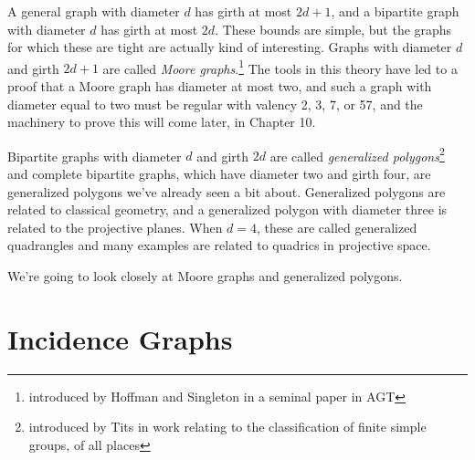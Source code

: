 \renewcommand{\exc}[1]{\subsubsection*{Exercise 5.#1}}


A general graph with diameter $d$ has girth at most $2d+1$, and a bipartite graph with diameter $d$ has girth at most $2d$.  These bounds are simple, but the graphs for which these are tight are actually kind of interesting.  Graphs with diameter $d$ and girth $2d+1$ are called \textit{Moore graphs}.\footnote{introduced by Hoffman and Singleton in a seminal paper in AGT}  The tools in this theory have led to a proof that a Moore graph has diameter at most two, and such a graph with diameter equal to two must be regular with valency 2, 3, 7, or 57, and the machinery to prove this will come later, in Chapter 10.

Bipartite graphs with diameter $d$ and girth $2d$ are called \textit{generalized polygons}\footnote{introduced by Tits in work relating to the classification of finite simple groups, of all places} and complete bipartite graphs, which have diameter two and girth four, are generalized polygons we've already seen a bit about.  Generalized polygons are related to classical geometry, and a generalized polygon with diameter three is related to the projective planes.  When $d=4$, these are called generalized quadrangles and many examples are related to quadrics in projective space.

We're going to look closely at Moore graphs and generalized polygons.

\section*{Incidence Graphs}



